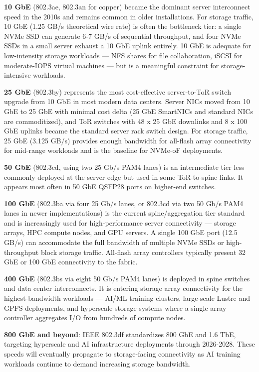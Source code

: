 \textbf{10 GbE} (802.3ae, 802.3an for copper) became the dominant server interconnect speed in the 2010s and remains common in older installations. For storage traffic, 10 GbE (1.25 GB/s theoretical wire rate) is often the bottleneck tier: a single NVMe SSD can generate 6-7 GB/s of sequential throughput, and four NVMe SSDs in a small server exhaust a 10 GbE uplink entirely. 10 GbE is adequate for low-intensity storage workloads --- NFS shares for file collaboration, iSCSI for moderate-IOPS virtual machines --- but is a meaningful constraint for storage-intensive workloads.

\textbf{25 GbE} (802.3by) represents the most cost-effective server-to-ToR switch upgrade from 10 GbE in most modern data centers. Server NICs moved from 10 GbE to 25 GbE with minimal cost delta (25 GbE SmartNICs and standard NICs are commoditized), and ToR switches with 48 x 25 GbE downlinks and 8 x 100 GbE uplinks became the standard server rack switch design. For storage traffic, 25 GbE (3.125 GB/s) provides enough bandwidth for all-flash array connectivity for mid-range workloads and is the baseline for NVMe-oF deployments.

\textbf{50 GbE} (802.3cd, using two 25 Gb/s PAM4 lanes) is an intermediate tier less commonly deployed at the server edge but used in some ToR-to-spine links. It appears most often in 50 GbE QSFP28 ports on higher-end switches.

\textbf{100 GbE} (802.3ba via four 25 Gb/s lanes, or 802.3cd via two 50 Gb/s PAM4 lanes in newer implementations) is the current spine/aggregation tier standard and is increasingly used for high-performance server connectivity --- storage arrays, HPC compute nodes, and GPU servers. A single 100 GbE port (12.5 GB/s) can accommodate the full bandwidth of multiple NVMe SSDs or high-throughput block storage traffic. All-flash array controllers typically present 32 GbE or 100 GbE connectivity to the fabric.

\textbf{400 GbE} (802.3bs via eight 50 Gb/s PAM4 lanes) is deployed in spine switches and data center interconnects. It is entering storage array connectivity for the highest-bandwidth workloads --- AI/ML training clusters, large-scale Lustre and GPFS deployments, and hyperscale storage systems where a single array controller aggregates I/O from hundreds of compute nodes.

\textbf{800 GbE and beyond}: IEEE 802.3df standardizes 800 GbE and 1.6 TbE, targeting hyperscale and AI infrastructure deployments through 2026-2028. These speeds will eventually propagate to storage-facing connectivity as AI training workloads continue to demand increasing storage bandwidth.

